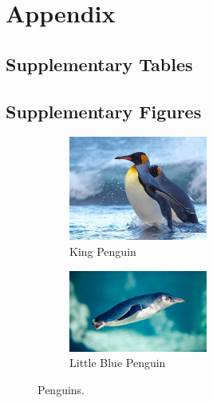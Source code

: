 \chapter{Appendix}
\label{cha:appendix}

\section{Supplementary Tables}




\clearpage
\section{Supplementary Figures}


\begin{figure}[hbt!]
    \centering
     \begin{subfigure}[b]{\textwidth}
         \centering
         \includegraphics[width=0.5\textwidth]{figures/king.jpeg}
         \caption{King Penguin}
         \label{fig:sub1}
     \end{subfigure}
     
     \begin{subfigure}[b]{\textwidth}
         \centering
         \includegraphics[width=0.5\textwidth]{figures/little_blue.jpg}
         \caption{Little Blue Penguin}
         \label{fig:sub2}
     \end{subfigure}
\caption{Penguins.}
\label{fig:example1}
\end{figure}
